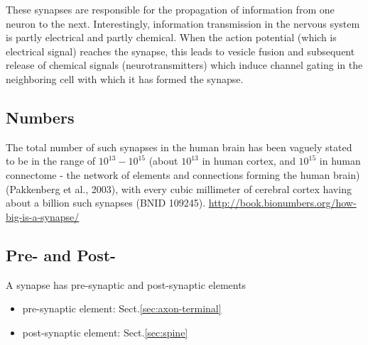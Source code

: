 These synapses are responsible for the propagation of information from one
neuron to the next.  Interestingly, information transmission in the nervous
system is partly electrical and partly chemical. When the action potential
(which is electrical signal) reaches the synapse, this leads to vesicle fusion
and subsequent release of chemical signals (neurotransmitters) which induce
channel gating in the neighboring cell with which it has formed the synapse.    
 

\subsection{Numbers}

The total number of such synapses in the human brain has been vaguely stated to
be in the range of $10^{13}-10^{15}$ (about $10^{13}$ in human cortex, and
$10^{15}$ in human connectome - the network of elements and connections forming
the human brain) (Pakkenberg et al., 2003), with every cubic millimeter of
cerebral cortex having about a billion such synapses (BNID 109245).
\url{http://book.bionumbers.org/how-big-is-a-synapse/}

  


\subsection{Pre- and Post-}

A synapse has pre-synaptic and post-synaptic elements
\begin{itemize}
  \item pre-synaptic element: Sect.\ref{sec:axon-terminal}
    
  \item post-synaptic element: Sect.\ref{sec:spine}
\end{itemize}

